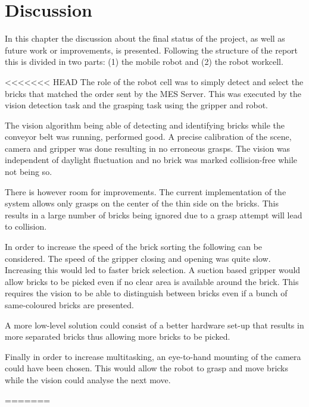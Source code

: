 \chapter{Discussion}
\label{chap:discussion}
In this chapter the discussion about the final status of the project, as well as future work or improvements, is presented.
Following the structure of the report this is divided in two parts: (1) the mobile robot and (2) the robot workcell.

<<<<<<< HEAD
The role of the robot cell was to simply detect and select the bricks that matched the order sent by the MES Server. This was executed by the vision detection task and the grasping task using the gripper and robot. 

The vision algorithm being able of detecting and identifying bricks while the conveyor belt was running, performed good. A precise calibration of the scene, camera and gripper was done resulting in no erroneous grasps. The vision was independent of daylight fluctuation and no brick was marked collision-free while not being so.

There is however room for improvements. The current implementation of the system allows only grasps on the center of the thin side on the bricks. This results in a large number of bricks being ignored due to a grasp attempt will lead to collision. 

In order to increase the speed of the brick sorting the following can be considered. 
The speed of the gripper closing and opening was quite slow. Increasing this would led to faster brick selection. 
A suction based gripper would allow bricks to be picked even if no clear area is available around the brick. This requires the vision to be able to distinguish between bricks even if a bunch of same-coloured bricks are presented. 

A more low-level solution could consist of a better hardware set-up that results in more separated bricks thus allowing more bricks to be picked. 

Finally in order to increase multitasking, an eye-to-hand mounting of the camera could have been chosen. This would allow the robot to grasp and move bricks while the vision could analyse the next move. 

=======
